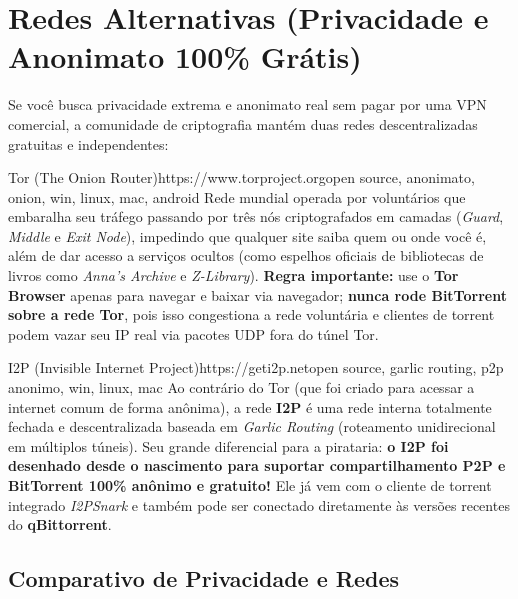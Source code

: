 \documentclass{pousadaguide}
\begin{document}
\section{Redes Alternativas (Privacidade e Anonimato 100\% Grátis)}

Se você busca privacidade extrema e anonimato real sem pagar por uma VPN comercial, a comunidade de criptografia mantém duas redes descentralizadas gratuitas e independentes:

\begin{ferramenta}[recomendado,logo=tor]{Tor (The Onion Router)}{https://www.torproject.org}{open source, anonimato, onion, win, linux, mac, android}
Rede mundial operada por voluntários que embaralha seu tráfego passando por três nós criptografados em camadas (\emph{Guard}, \emph{Middle} e \emph{Exit Node}), impedindo que qualquer site saiba quem ou onde você é, além de dar acesso a serviços ocultos  (como espelhos oficiais de bibliotecas de livros como \emph{Anna's Archive} e \emph{Z-Library}). \textbf{Regra importante:} use o \textbf{Tor Browser} apenas para navegar e baixar via navegador; \textbf{nunca rode BitTorrent sobre a rede Tor}, pois isso congestiona a rede voluntária e clientes de torrent podem vazar seu IP real via pacotes UDP fora do túnel Tor. 
\end{ferramenta}

\begin{ferramenta}[recomendado,logo=i2p]{I2P (Invisible Internet Project)}{https://geti2p.net}{open source, garlic routing, p2p anonimo, win, linux, mac}
Ao contrário do Tor (que foi criado para acessar a internet comum de forma anônima), a rede \textbf{I2P} é uma rede interna totalmente fechada e descentralizada baseada em \emph{Garlic Routing} (roteamento unidirecional em múltiplos túneis). Seu grande diferencial para a pirataria: \textbf{o I2P foi desenhado desde o nascimento para suportar compartilhamento P2P e BitTorrent 100\% anônimo e gratuito!} Ele já vem com o cliente de torrent integrado \emph{I2PSnark} e também pode ser conectado diretamente às versões recentes do \textbf{qBittorrent}. 
\end{ferramenta}

\subsection{Comparativo de Privacidade e Redes}
\end{document}

